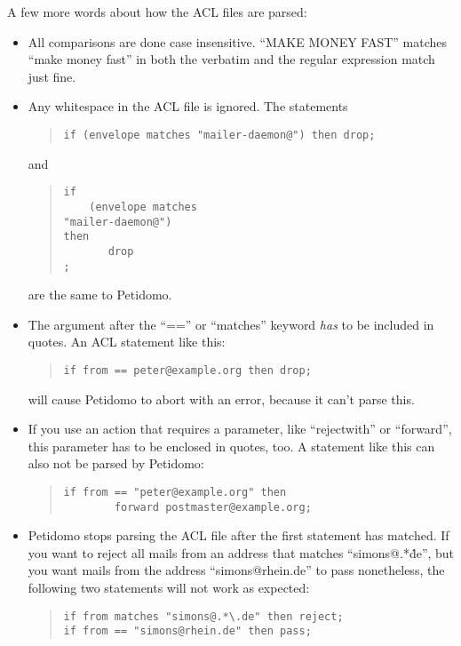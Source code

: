 \documentclass[a4paper,11pt]{scrreprt}
\begin{document}
A few more words about how the ACL files are parsed:
\begin{itemize}

\item All comparisons are done case insensitive. ``MAKE MONEY FAST''
matches ``make money fast'' in both the verbatim and the regular
expression match just fine.

\item Any whitespace in the ACL file is ignored. The statements
\begin{quote}
\begin{verbatim}
if (envelope matches "mailer-daemon@") then drop;
\end{verbatim}
\end{quote}
and
\begin{quote}
\begin{verbatim}
if
    (envelope matches
"mailer-daemon@")
then
       drop
;
\end{verbatim}
\end{quote}
are the same to Petidomo.

\item The argument after the ``=='' or ``matches'' keyword \emph{has}
to be included in quotes. An ACL statement like this:
\begin{quote}
\begin{verbatim}
if from == peter@example.org then drop;
\end{verbatim}
\end{quote}
will cause Petidomo to abort with an error, because it can't parse
this.

\item If you use an action that requires a parameter, like
``rejectwith'' or ``forward'', this parameter has to be enclosed in
quotes, too. A statement like this can also not be parsed by
Petidomo:
\begin{quote}
\begin{verbatim}
if from == "peter@example.org" then
        forward postmaster@example.org;
\end{verbatim}
\end{quote}

\item Petidomo stops parsing the ACL file after the first statement
has matched. If you want to reject all mails from an address that
matches ``simons@.*\.de'', but you want mails from the address
``simons@rhein.de'' to pass nonetheless, the following two statements
will not work as expected:
\begin{quote}
\begin{verbatim}
if from matches "simons@.*\.de" then reject;
if from == "simons@rhein.de" then pass;
\end{verbatim}
\end{quote}


\end{itemize}
\end{document}
